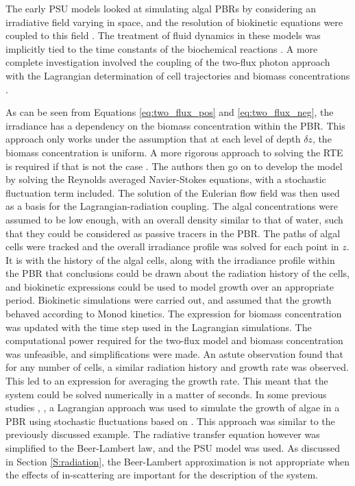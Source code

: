 \skippingparagraph
The early PSU models looked at simulating algal PBRs by considering an irradiative field varying in space, and the resolution of biokinetic equations were coupled to this field \cite{wu2001,wu2002,merchuk2003,merchuk2007}. The treatment of fluid dynamics in these models was implicitly tied to the time constants of the biochemical reactions \cite{merchuk2007}. A more complete investigation involved the coupling of the two-flux photon approach with the Lagrangian determination of cell trajectories and biomass concentrations \cite{pruvost2008}.



As can be seen from Equations \ref{eq:two_flux_pos} and \ref{eq:two_flux_neg}, the irradiance has a dependency on the biomass concentration within the PBR. This approach only works under the assumption that at each level of depth $\delta z$, the biomass concentration is uniform. A more rigorous approach to solving the RTE is required if that is not the case \cite{pruvost2008}. The authors then go on to develop the model by solving the Reynolds averaged Navier-Stokes equations, with a stochastic fluctuation term included. The solution of the Eulerian flow field was then used as a basis for the Lagrangian-radiation coupling. The algal concentrations were assumed to be low enough, with an overall density similar to that of water, such that they could be considered as passive tracers in the PBR. The paths of algal cells were tracked and the overall irradiance profile was solved for each point in $z$. It is with the history of the algal cells, along with the irradiance profile within the PBR that conclusions could be drawn about the radiation history of the cells, and biokinetic expressions could be used to model growth over an appropriate period. Biokinetic simulations were carried out, and assumed that the growth behaved according to Monod kinetics. The expression for biomass concentration was updated with the time step used in the Lagrangian simulations. The computational power required for the two-flux model and biomass concentration was unfeasible, and simplifications were made. An astute observation found that for any number of cells, a similar radiation history and growth rate was observed. This led to an expression for averaging the growth rate. This meant that the system could be solved numerically in a matter of seconds. In some previous studies \cite{marshall2011}, \cite{marschall2012}, a Lagrangian approach was used to simulate the growth of algae in a PBR using stochastic fluctuations based on \cite{thomson1987}. This approach was similar to the previously discussed example. The radiative transfer equation however was simplified to the Beer-Lambert law, and the PSU model \cite{eilers1988} was used. As discussed in Section \ref{S:radiation}, the Beer-Lambert approximation is not appropriate when the effects of in-scattering are important for the description of the system. 




